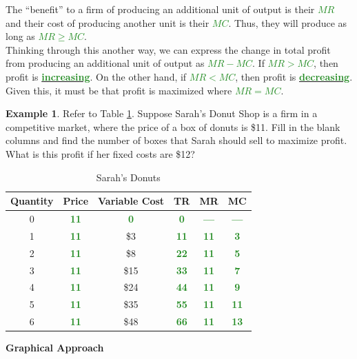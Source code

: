 \documentclass[11pt]{article}\usepackage[]{graphicx}\usepackage[]{color}
\theoremstyle{definition}
\newtheorem{exmp}{Example}[section]
\newcommand{\ddp}[1]{{\textbf{\textcolor{ForestGreen}{#1}}}}
\newcommand{\dd}[1]{{\underline{\textbf{\textcolor{ForestGreen}{#1}}}}}
\begin{document}
	The ``benefit'' to a firm of producing an additional unit of output is their \dd{$MR$} and their cost of producing another unit is their \dd{$MC$}. Thus, they will produce as long as \dd{$MR \ge MC$}. 
	\\
	
	Thinking through this another way, we can express the change in total profit from producing an additional unit of output as \dd{$MR - MC$}. If \dd{$MR > MC$}, then profit is \dd{increasing}. On the other hand, if \dd{$MR < MC$}, then profit is \dd{decreasing}. Given this, it must be that profit is maximized where \dd{$MR = MC$}.
	\\
	
	\begin{exmp}
		Refer to Table \ref{donuts}. Suppose Sarah's Donut Shop is a firm in a competitive market, where the price of a box of donuts is \$11. Fill in the blank columns and find the number of boxes that Sarah should sell to maximize profit. What is this profit if her fixed costs are \$12?
	\pagebreak
	\begin{table}[ht]
		\centering
		\caption{Sarah's Donuts}
		\label{donuts}
		\begin{tabular}{ c|c|c|c|c|c}        
			
			Quantity & Price & Variable Cost  & TR & MR & MC \\
			\hline
			0 & \ddp{11} &  \ddp{0} &  \ddp{0} &  \ddp{---} &  \ddp{---} \\
			1 &  \ddp{11} & \$3 &  \ddp{11} &  \ddp{11} &  \ddp{3} \\
			2 &  \ddp{11} & \$8 &  \ddp{22} &  \ddp{11} &  \ddp{5}\\
			3 &  \ddp{11} & \$15 &  \ddp{33} & \ddp{11}  &  \ddp{7}\\
			4 &  \ddp{11} & \$24 &  \ddp{44} &  \ddp{11}&  \ddp{9} \\
			5 & \ddp{11} & \$35 &  \ddp{55} & \ddp{11} & \ddp{11} \\
			6 & \ddp{11} & \$48 &   \ddp{66}& \ddp{11} & \ddp{13} \\
		\end{tabular}
	\end{table} 
\end{exmp} 
	
	\textbf{Graphical Approach}
	
\end{document}
